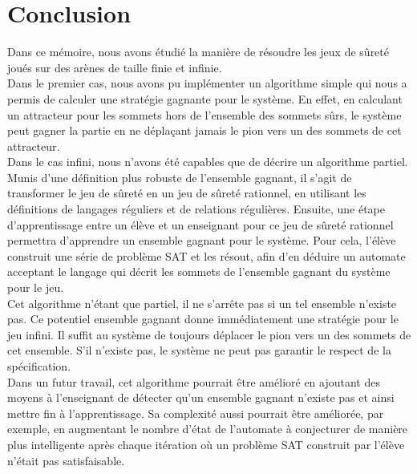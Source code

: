 \documentclass[12pt,a4paper,oneside,titlepage]{report}
\begin{document}
\chapter*{Conclusion}
\renewcommand{\leftmark}{CONCLUSION}
Dans ce mémoire, nous avons étudié la manière de résoudre les jeux de sûreté joués sur des arènes de taille finie et infinie.\\

Dans le premier cas, nous avons pu implémenter un algorithme simple qui nous a permis de calculer une stratégie gagnante pour le système. En effet, en calculant un attracteur pour les sommets hors de l'ensemble des sommets sûrs, le système peut gagner la partie en ne déplaçant jamais le pion vers un des sommets de cet attracteur.\\

Dans le cas infini, nous n'avons été capables que de décrire un algorithme partiel. Munis d'une définition plus robuste de l'ensemble gagnant, il s'agit de transformer le jeu de sûreté en un jeu de sûreté rationnel, en utilisant les définitions de langages réguliers et de relations régulières. Ensuite, une étape d'apprentissage entre un élève et un enseignant pour ce jeu de sûreté rationnel permettra d'apprendre un ensemble gagnant pour le système. Pour cela, l'élève construit une série de problème SAT et les résout, afin d'en déduire un automate acceptant le langage qui décrit les sommets de l'ensemble gagnant du système pour le jeu.\\
Cet algorithme n'étant que partiel, il ne s'arrête pas si un tel ensemble n'existe pas. Ce potentiel ensemble gagnant donne immédiatement une stratégie pour le jeu infini. Il suffit au système de toujours déplacer le pion vers un des sommets de cet ensemble. S'il n'existe pas, le système ne peut pas garantir le respect de la spécification.\\

Dans un futur travail, cet algorithme pourrait être amélioré en ajoutant des moyens à l'enseignant de détecter qu'un ensemble gagnant n'existe pas et ainsi mettre fin à l'apprentissage. Sa complexité aussi pourrait être améliorée, par exemple, en augmentant le nombre d'état de l'automate à conjecturer de manière plus intelligente après chaque itération où un problème SAT construit par l'élève n'était pas satisfaisable.\\

\newpage




\end{document}
